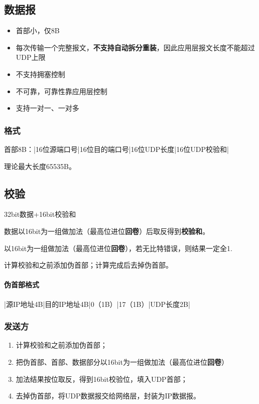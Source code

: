 \subsection{数据报}
\begin{itemize}
    \item 首部小，仅8B
    \item 每次传输一个完整报文，\textbf{不支持自动拆分重装}，因此应用层报文长度不能超过UDP上限
    \item 不支持拥塞控制
    \item 不可靠，可靠性靠应用层控制
    \item 支持一对一、一对多
\end{itemize}

\subsubsection{格式}
首部8B：|16位源端口号|16位目的端口号|16位UDP长度|16位UDP校验和|

理论最大长度65535B。


\subsection{校验}
32bit数据+16bit校验和

数据以16bit为一组做加法（最高位进位\textbf{回卷}）后取反得到\textbf{校验和}。

以16bit为一组做加法（最高位进位\textbf{回卷}），若无比特错误，则结果一定全1.

计算校验和之前添加伪首部；计算完成后去掉伪首部。

\paragraph{伪首部格式}
|源IP地址4B|目的IP地址4B|0（1B）|17（1B）|UDP长度2B|

\subsubsection{发送方}
\begin{enumerate}
    \item 计算校验和之前添加伪首部；
    \item 把伪首部、首部、数据部分以16bit为一组做加法（最高位进位\textbf{回卷}）
    \item 加法结果按位取反，得到16bit校验位，填入UDP首部；
    \item 去掉伪首部，将UDP数据报交给网络层，封装为IP数据报。
\end{enumerate}

